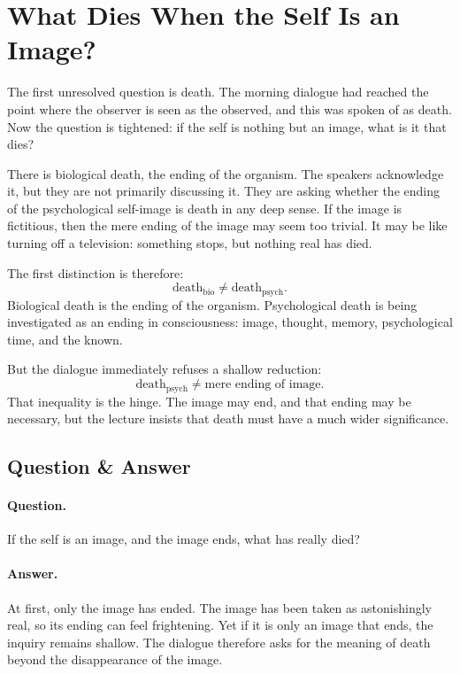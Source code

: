 \section{What Dies When the Self Is an Image?}

The first unresolved question is death. The morning dialogue had reached the point where the observer is seen as the observed, and this was spoken of as death. Now the question is tightened: if the self is nothing but an image, what is it that dies?

There is biological death, the ending of the organism. The speakers acknowledge it, but they are not primarily discussing it. They are asking whether the ending of the psychological self-image is death in any deep sense. If the image is fictitious, then the mere ending of the image may seem too trivial. It may be like turning off a television: something stops, but nothing real has died.

The first distinction is therefore:
\begin{equation}
\text{death}_{\mathrm{bio}}
\neq
\text{death}_{\mathrm{psych}}.
\end{equation}
Biological death is the ending of the organism. Psychological death is being investigated as an ending in consciousness: image, thought, memory, psychological time, and the known.

But the dialogue immediately refuses a shallow reduction:
\begin{equation}
\text{death}_{\mathrm{psych}}
\neq
\text{mere ending of image}.
\end{equation}
That inequality is the hinge. The image may end, and that ending may be necessary, but the lecture insists that death must have a much wider significance.

\subsection{Question \& Answer}

\paragraph{Question.}
If the self is an image, and the image ends, what has really died?

\paragraph{Answer.}
At first, only the image has ended. The image has been taken as astonishingly real, so its ending can feel frightening. Yet if it is only an image that ends, the inquiry remains shallow. The dialogue therefore asks for the meaning of death beyond the disappearance of the image.

